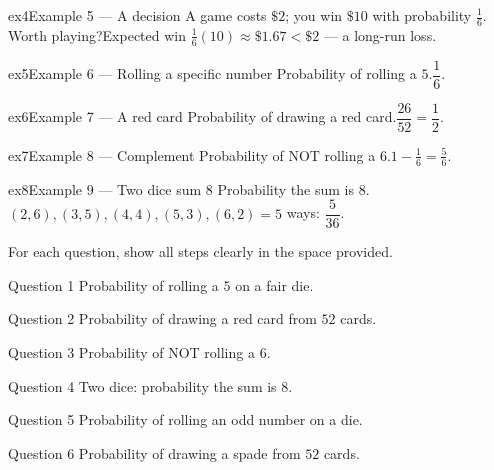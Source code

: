 \documentclass[11pt]{article}
\begin{document}
\begin{example}{ex4}{Example 5 --- A decision}
A game costs $\$2$; you win $\$10$ with probability $\tfrac16$. Worth playing?\soln Expected win $\tfrac16(10)\approx\$1.67<\$2$ — a long-run loss.
\end{example}

\begin{example}{ex5}{Example 6 --- Rolling a specific number}
Probability of rolling a $5$.\soln $\dfrac16$.
\end{example}

\begin{example}{ex6}{Example 7 --- A red card}
Probability of drawing a red card.\soln $\dfrac{26}{52}=\dfrac12$.
\end{example}

\begin{example}{ex7}{Example 8 --- Complement}
Probability of NOT rolling a $6$.\soln $1-\tfrac16=\tfrac56$.
\end{example}

\begin{example}{ex8}{Example 9 --- Two dice sum 8}
Probability the sum is $8$.\soln $(2,6),(3,5),(4,4),(5,3),(6,2)=5$ ways: $\dfrac{5}{36}$.
\end{example}

\clearpage
{}
For each question, show all steps clearly in the space provided.

\begin{qbox}{Question 1}
Probability of rolling a $5$ on a fair die.\workspace{2.4cm}
\end{qbox}

\begin{qbox}{Question 2}
Probability of drawing a red card from $52$ cards.\workspace{2.4cm}
\end{qbox}

\begin{qbox}{Question 3}
Probability of NOT rolling a $6$.\workspace{2.4cm}
\end{qbox}

\begin{qbox}{Question 4}
Two dice: probability the sum is $8$.\workspace{2.4cm}
\end{qbox}

\begin{qbox}{Question 5}
Probability of rolling an odd number on a die.\workspace{2.4cm}
\end{qbox}

\begin{qbox}{Question 6}
Probability of drawing a spade from $52$ cards.\workspace{2.4cm}
\end{qbox}
\end{document}
